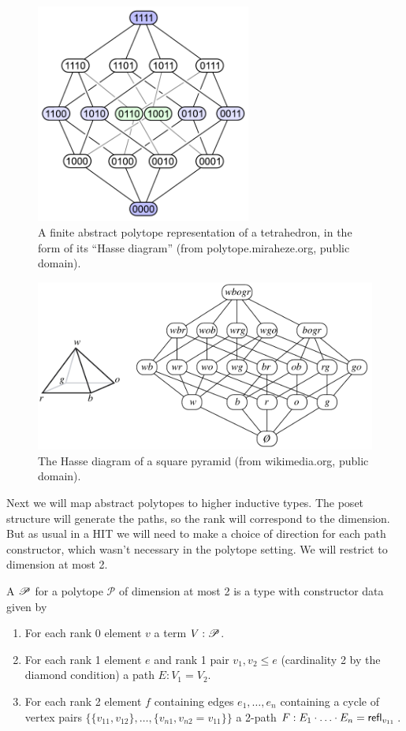 \begin{figure}[htbp]
\centering
\includegraphics[width=200pt]{hasse_tetrahedron.pdf}
\caption{A finite abstract polytope representation of a tetrahedron, in the form of its ``Hasse diagram'' (from polytope.miraheze.org, public domain).}
\label{fig:hasse_tetrahedron}
\end{figure}

\begin{figure}[htbp]
\centering
\includegraphics[width=350pt]{pyramid.pdf}
\caption{The Hasse diagram of a square pyramid (from wikimedia.org, public domain).}
\label{fig:hasse_pyramid}
\end{figure}

Next we will map abstract polytopes to higher inductive types. The poset structure will generate the paths, so the rank will correspond to the dimension. But as usual in a HIT we will need to make a choice of direction for each path constructor, which wasn't necessary in the polytope setting. We will restrict to dimension at most 2.

\begin{mydef}
A  \( \P \) for a polytope \( \mathcal{P} \) of dimension at most 2 is a type with constructor data given by
\begin{enumerate}
\item For each rank 0 element \( v \) a term \( V:\P \).
\item For each rank 1 element \( e \) and rank 1 pair \( v_1,v_2\leq e \) (cardinality 2 by the diamond condition) a path \( E:V_1=V_2 \).
\item For each rank 2 element \( f \) containing edges \( e_1,\ldots,e_n \) containing a cycle of vertex pairs \( \{\{v_{11},v_{12}\},\ldots,\{v_{n1},v_{n2}=v_{11}\}\} \) a 2-path \( F:E_1\cdot\ldots\cdot E_n=\refl_{v_{11}} \).
\end{enumerate}
\end{mydef}

